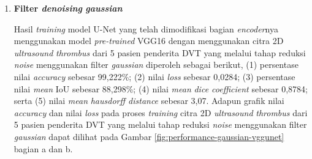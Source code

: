 \begin{enumerate}
	\item \textbf{Filter \textit{denoising} \textit{gaussian}}
	
	Hasil \textit{training} model U-Net yang telah dimodifikasi bagian \textit{encoder}nya menggunakan model \textit{pre-trained} VGG16 dengan menggunakan citra 2D \textit{ultrasound} \textit{thrombus} dari 5 pasien penderita DVT yang melalui tahap reduksi \textit{noise} menggunakan filter \textit{gaussian} diperoleh sebagai berikut, (1) persentase nilai \textit{accuracy} sebesar 99,222\%; (2) nilai \textit{loss} sebesar 0,0284; (3) persentase nilai \textit{mean} IoU sebesar 88,298\%; (4) nilai \textit{mean} \textit{dice coefficient} sebesar 0,8784; serta (5) nilai \textit{mean} \textit{hausdorff distance} sebesar 3,07. Adapun grafik nilai \textit{accuracy} dan nilai \textit{loss} pada proses \textit{training} citra 2D \textit{ultrasound} \textit{thrombus} dari 5 pasien penderita DVT yang melalui tahap reduksi \textit{noise} menggunakan filter \textit{gaussian} dapat dilihat pada Gambar \ref{fig:performance-gaussian-vggunet} bagian a dan b.
	

\end{enumerate}
